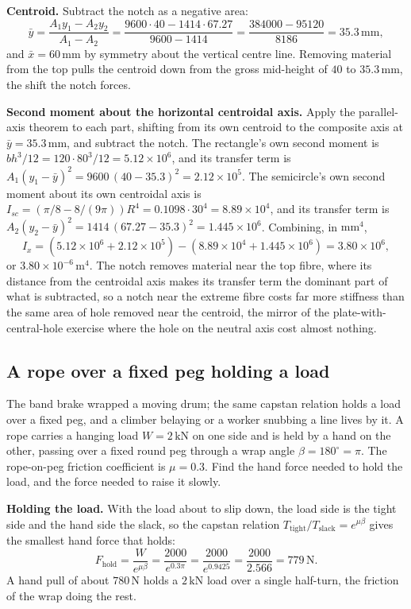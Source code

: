\textbf{Centroid.} Subtract the notch as a negative area:
\[
\bar{y} = \frac{A_1 y_1 - A_2 y_2}{A_1 - A_2}
= \frac{9600 \cdot 40 - 1414 \cdot 67.27}{9600 - 1414}
= \frac{384000 - 95120}{8186} = 35.3\,\si{\milli\meter},
\]
and $\bar{x} = 60\,\si{\milli\meter}$ by symmetry about the vertical centre line.
Removing material from the top pulls the centroid down from the gross
mid-height of $40$ to $35.3\,\si{\milli\meter}$, the shift the notch forces.

\textbf{Second moment about the horizontal centroidal axis.} Apply the
parallel-axis theorem to each part, shifting from its own centroid to the
composite axis at $\bar{y} = 35.3\,\si{\milli\meter}$, and subtract the notch.
The rectangle's own second moment is
$b h^3/12 = 120 \cdot 80^3/12 = 5.12\times 10^6$, and its transfer term is
$A_1(y_1 - \bar{y})^2 = 9600\,(40 - 35.3)^2 = 2.12\times 10^5$. The semicircle's
own second moment about its own centroidal axis is
$I_{sc} = (\pi/8 - 8/(9\pi))R^4 = 0.1098 \cdot 30^4 = 8.89\times 10^4$, and its
transfer term is $A_2(y_2 - \bar{y})^2 = 1414\,(67.27 - 35.3)^2 =
1.445\times 10^6$. Combining, in $\si{\milli\meter\tothe{4}}$,
\[
I_x = (5.12\times 10^6 + 2.12\times 10^5)
- (8.89\times 10^4 + 1.445\times 10^6) = 3.80\times 10^6,
\]
or $3.80\times 10^{-6}\,\si{\meter\tothe{4}}$. The notch removes material near
the top fibre, where its distance from the centroidal axis makes its transfer
term the dominant part of what is subtracted, so a notch near the extreme fibre
costs far more stiffness than the same area of hole removed near the centroid,
the mirror of the plate-with-central-hole exercise where the hole on the neutral
axis cost almost nothing.

\subsection{A rope over a fixed peg holding a load}

The band brake wrapped a moving drum; the same capstan relation holds a load
over a fixed peg, and a climber belaying or a worker snubbing a line lives by it.
A rope carries a hanging load $W = 2\,\text{kN}$ on one side and is held by a
hand on the other, passing over a fixed round peg through a wrap angle
$\beta = 180^\circ = \pi$. The rope-on-peg friction coefficient is $\mu = 0.3$.
Find the hand force needed to hold the load, and the force needed to raise it
slowly.

\textbf{Holding the load.} With the load about to slip down, the load side is
the tight side and the hand side the slack, so the capstan relation
$T_{\text{tight}}/T_{\text{slack}} = e^{\mu\beta}$ gives the smallest hand force
that holds:
\[
F_{\text{hold}} = \frac{W}{e^{\mu\beta}}
= \frac{2000}{e^{0.3\pi}} = \frac{2000}{e^{0.9425}}
= \frac{2000}{2.566} = 779\,\text{N}.
\]
A hand pull of about $780\,\text{N}$ holds a $2\,\text{kN}$ load over a single
half-turn, the friction of the wrap doing the rest.

